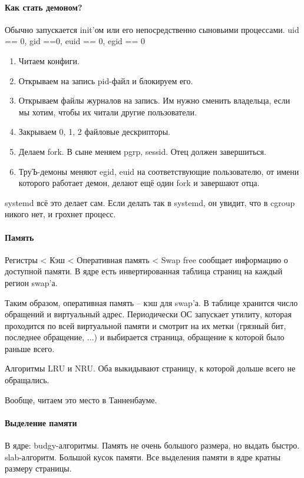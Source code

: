 \documentclass[a4paper,10pt]{article}
\begin{document}
\paragraph{Как стать демоном?}
Обычно запускается init'ом или его непосредственно сыновьими процессами. 
uid == 0, gid ==0, euid == 0, egid == 0

\begin{enumerate}
 \item Читаем конфиги.
 \item Открываем на запись pid-файл и блокируем его.
 \item Открываем файлы журналов на запись. Им нужно сменить владельца, если мы хотим, чтобы их читали другие пользователи.
 \item Закрываем 0, 1, 2 файловые дескрипторы.
 \item Делаем fork. В сыне меняем pgrp, sessid. Отец должен завершиться.
 \item ТруЪ-демоны меняют egid, euid на соответствующие пользователю, от имени которого работает демон, делают ещё один fork и завершают отца.
\end{enumerate}
systemd всё это делает сам. Если делать так в systemd, он увидит, что в cgroup никого нет, и грохнет процесс.

\paragraph{Память}
Регистры < Кэш < Оперативная память < Swap
free сообщает информацию о доступной памяти. В ядре есть инвертированная таблица страниц на каждый регион swap'а.

Таким образом, оперативная память -- кэш для swap'а. В таблице хранится число обращений и виртуальный адрес.
Периодически ОС запускает утилиту, которая проходится по всей виртуальной памяти и смотрит на их метки (грязный бит, последнее обращение, ...) и выбирается страница, обращение к которой было раньше всего.

Алгоритмы LRU и NRU. Оба выкидывают страницу, к которой дольше всего не обращались.

Вообще, читаем это место в Танненбауме.

\paragraph{Выделение памяти}

В ядре:
budgy-алгоритмы. Память не очень большого размера, но выдать быстро.
slab-алгоритм. Большой кусок памяти.
Все выделения памяти в ядре кратны размеру страницы.
\end{document}
